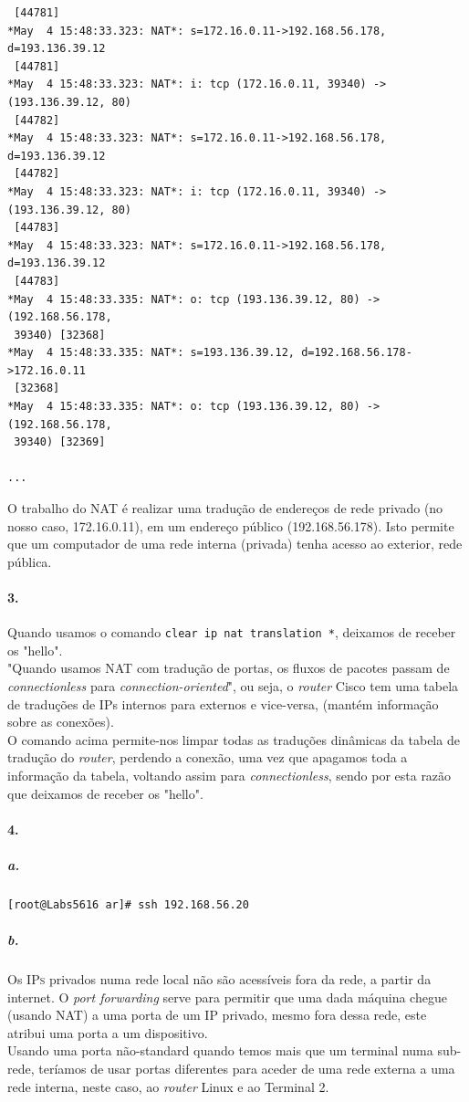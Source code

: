 \begin{verbatim}
 [44781]
*May  4 15:48:33.323: NAT*: s=172.16.0.11->192.168.56.178, d=193.136.39.12
 [44781]
*May  4 15:48:33.323: NAT*: i: tcp (172.16.0.11, 39340) -> (193.136.39.12, 80)
 [44782]
*May  4 15:48:33.323: NAT*: s=172.16.0.11->192.168.56.178, d=193.136.39.12
 [44782]
*May  4 15:48:33.323: NAT*: i: tcp (172.16.0.11, 39340) -> (193.136.39.12, 80)
 [44783]
*May  4 15:48:33.323: NAT*: s=172.16.0.11->192.168.56.178, d=193.136.39.12
 [44783]
*May  4 15:48:33.335: NAT*: o: tcp (193.136.39.12, 80) -> (192.168.56.178,
 39340) [32368]
*May  4 15:48:33.335: NAT*: s=193.136.39.12, d=192.168.56.178->172.16.0.11
 [32368]
*May  4 15:48:33.335: NAT*: o: tcp (193.136.39.12, 80) -> (192.168.56.178,
 39340) [32369]

...
\end{verbatim}

O trabalho do NAT é realizar uma tradução de endereços de rede privado (no nosso caso, \textsf{172.16.0.11}), em um endereço público (\textsf{192.168.56.178}). Isto permite  que um computador de uma rede interna (privada) tenha acesso ao exterior, rede pública.


\paragraph{3.}
Quando usamos o comando \texttt{clear ip nat translation *}, deixamos de receber os \textsf{"hello"}.\\
"Quando usamos NAT com tradução de portas, os fluxos de pacotes passam de \emph{connectionless} para \emph{connection-oriented}", ou seja, o \textsf{\emph{router} Cisco} tem uma tabela de traduções de \textsf{IPs} internos para externos e vice-versa, (mantém informação sobre as conexões).\\
O comando acima permite-nos limpar todas as traduções dinâmicas da tabela de tradução do \emph{router}, perdendo a conexão, uma vez que apagamos toda a informação da tabela, voltando assim para \emph{connectionless}, sendo por esta razão que deixamos de receber os \textsf{"hello"}.


\paragraph{4.}

\subparagraph{a.}
\begin{verbatim}
[root@Labs5616 ar]# ssh 192.168.56.20
\end{verbatim}


\subparagraph{b.}
Os \textsc{IPs} privados numa rede local não são acessíveis fora da rede, a partir da internet. O \emph{port forwarding} serve para permitir que uma dada máquina chegue (usando NAT) a uma porta de um IP privado, mesmo fora dessa rede, este atribui uma porta a um dispositivo.\\
Usando uma porta não-standard quando temos mais que um terminal numa sub-rede, teríamos de usar portas diferentes para aceder de uma rede externa a uma rede interna, neste caso, ao \textsf{\emph{router} Linux} e ao \textsf{Terminal 2}.

